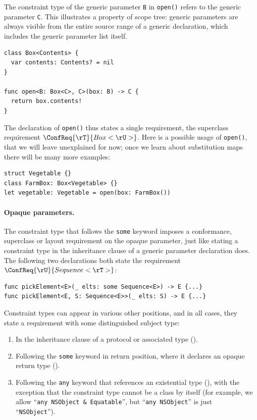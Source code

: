 \documentclass[../generics]{subfiles}
\begin{document}
\begin{example}
The constraint type of the generic parameter \texttt{B} in \texttt{open()} refers to the generic parameter \texttt{C}. This illustrates a property of scope tree: generic parameters are always visible from the entire source range of a generic declaration, which includes the generic parameter list itself.
\begin{Verbatim}
class Box<Contents> {
  var contents: Contents? = nil
}

func open<B: Box<C>, C>(box: B) -> C {
  return box.contents!
}
\end{Verbatim}
The declaration of \texttt{open()} thus states a single requirement, the superclass requirement $\ConfReq{\rT}{Box<\rU>}$. Here is a possible usage of \texttt{open()}, that we will leave unexplained for now; once we learn about substitution maps there will be many more examples:
\begin{Verbatim}
struct Vegetable {}
class FarmBox: Box<Vegetable> {}
let vegetable: Vegetable = open(box: FarmBox())
\end{Verbatim}
\end{example}

\paragraph{Opaque parameters.}
The constraint type that follows the \texttt{some} keyword imposes a conformance, superclass or layout requirement on the opaque parameter, just like stating a constraint type in the inheritance clause of a generic parameter declaration does. The following two declarations both state the requirement $\ConfReq{\rU}{Sequence<\rT>}$:
\begin{Verbatim}
func pickElement<E>(_ elts: some Sequence<E>) -> E {...}
func pickElement<E, S: Sequence<E>>(_ elts: S) -> E {...}
\end{Verbatim}

Constraint types can appear in various other positions, and in all cases, they state a requirement with some distinguished subject type:
\begin{enumerate}
\item In the inheritance clause of a protocol or associated type ().
\item Following the \texttt{some} keyword in return position, where it declares an opaque return type ().
\item Following the \texttt{any} keyword that references an existential type (), with the exception that the constraint type cannot be a class by itself (for example, we allow ``\verb|any NSObject & Equatable|'', but ``\verb|any NSObject|'' is just ``\texttt{NSObject}'').
\end{enumerate}
\end{document}

